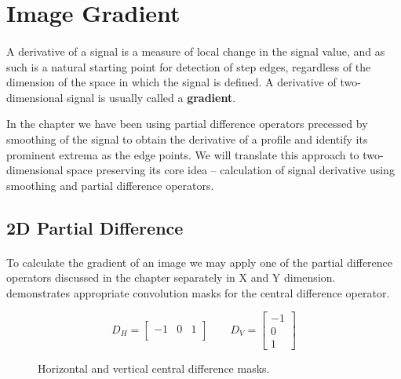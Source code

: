 \section{Image Gradient}

\paragraph*{}
A derivative of a signal is a measure of local change in the signal value, and as such is a natural starting point for detection of step edges, regardless of the dimension of the space in which the signal is defined. A derivative of two-dimensional signal is usually called a \textbf{gradient}. 

In the  chapter we have been using partial difference operators precessed by smoothing of the signal to obtain the derivative of a profile and identify its prominent extrema as the edge points. We will translate this approach to two-dimensional space preserving its core idea -- calculation of signal derivative using smoothing and partial difference operators.

\subsection{2D Partial Difference}

\paragraph*{}
To calculate the gradient of an image we may apply one of the partial difference operators discussed in the  chapter separately in X and Y dimension.  demonstrates appropriate convolution masks for the central difference operator.

\begin{figure}[h!]
\begin{equation*}
D_{H} = 
	\begin{bmatrix}
	-1 & 0 & 1 \\
	\end{bmatrix}\qquad
D_{V} = 
	\begin{bmatrix}
	-1 \\
	0 \\
	1
	\end{bmatrix}
\end{equation*}
\caption{Horizontal and vertical central difference masks.}
\label{fig:CentralDifferenceMasks}
\end{figure}

